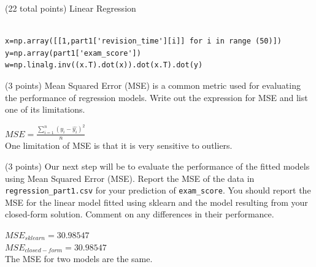 \documentclass[12pt]{article}
\begin{document}
\begin{question}{(22 total points) Linear Regression}
\begin{subquestion}
\begin{answerbox}{20em}
\begin{verbatim}

x=np.array([[1,part1['revision_time'][i]] for i in range (50)])
y=np.array(part1['exam_score'])
w=np.linalg.inv((x.T).dot(x)).dot(x.T).dot(y)

\end{verbatim}

\end{answerbox}



\end{subquestion}



%
%
\begin{subquestion}{(3 points) Mean Squared Error (MSE) is a common metric used for evaluating the performance of regression models. 
Write out the expression for MSE and list one of its limitations. \\
}


\begin{answerbox}{10em}
$MSE=\frac{\sum_{i=1}^{n} (y_i-\hat{y_i})^2}{n}$
\\One limitation of MSE is that it is very sensitive to outliers.
\end{answerbox}



\end{subquestion}


 
%
%
\begin{subquestion}{(3 points) Our next step will be to evaluate the performance of the fitted models using Mean Squared Error (MSE). 
Report the MSE of the data in \texttt{regression\_part1.csv} for your prediction of \texttt{exam\_score}.
You should report the MSE for the linear model fitted using sklearn and the model resulting from your closed-form solution. 
Comment on any differences in their performance. 
}


\begin{answerbox}{10em}

$MSE_{sklearn}=30.98547$
\\$MSE_{closed-form}=30.98547$
\\The MSE for two models are the same.

\end{answerbox}


\end{subquestion}





\end{question}
\end{document}

